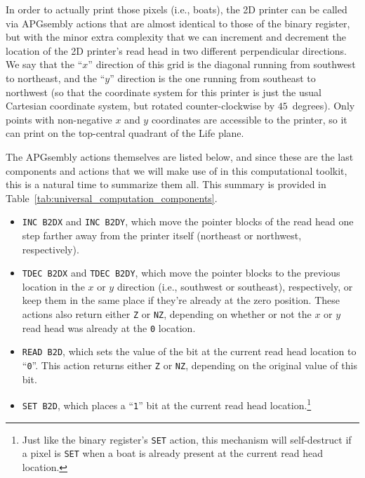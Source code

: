 In order to actually print those pixels (i.e., boats), the 2D printer can be called via APGsembly actions that are almost identical to those of the binary register, but with the minor extra complexity that we can increment and decrement the location of the 2D printer's read head  in two different perpendicular directions. We say that the ``$x$'' direction of this grid is the diagonal running from southwest to northeast, and the ``$y$'' direction is the one running from southeast to northwest (so that the coordinate system for this printer is just the usual Cartesian coordinate system, but rotated counter-clockwise by $45$~degrees). Only points with non-negative $x$ and $y$ coordinates are accessible to the printer, so it can print on the top-central quadrant of the Life plane.

The APGsembly actions themselves are listed below, and since these are the last components and actions that we will make use of in this computational toolkit, this is a natural time to summarize them all. This summary is provided in Table~\ref{tab:universal_computation_components}.\smallskip

\begin{itemize}
	\item \texttt{INC B2DX} and \texttt{INC B2DY}, which move the pointer blocks of the read head one step farther away from the printer itself (northeast or northwest, respectively).\smallskip
	
	\item \texttt{TDEC B2DX} and \texttt{TDEC B2DY}, which move the pointer blocks to the previous location in the $x$ or $y$ direction (i.e., southwest or southeast), respectively, or keep them in the same place if they're already at the zero position. These actions also return either \texttt{Z} or \texttt{NZ}, depending on whether or not the $x$ or $y$ read head was already at the \texttt{0} location.\smallskip
	
	\item \texttt{READ B2D}, which sets the value of the bit at the current read head location to ``\texttt{0}''. This action returns either \texttt{Z} or \texttt{NZ}, depending on the original value of this bit.\smallskip
	
	\item \texttt{SET B2D}, which places a ``\texttt{1}'' bit at the current read head location.\footnote{Just like the binary register's \texttt{SET} action, this mechanism will self-destruct if a pixel is \texttt{SET} when a boat is already present at the current read head location.}\smallskip
\end{itemize}


